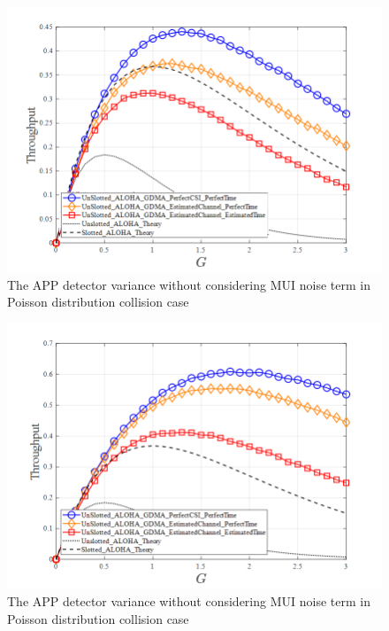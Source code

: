 \begin{figure}[t!]
 \centering
 \includegraphics[width=14cm]{fig/RACH_poisson_case.png}
 \caption{The APP detector variance without considering MUI noise term in Poisson distribution collision case}
 \label{fig:RACH_poisson_case}
\end{figure}

\begin{figure}[b!]
 \centering
 \includegraphics[width=14cm]{fig/RACH_poisson_case2.png}
 \caption{The APP detector variance without considering MUI noise term in Poisson distribution collision case}
 \label{fig:RACH_poisson_case2}
\end{figure}


